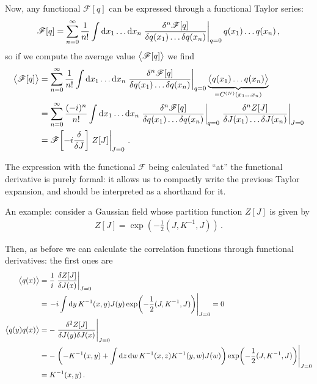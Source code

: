 \documentclass[main.tex]{subfiles}
\begin{document}
Now, any functional \(\mathscr{F} [q]\) can be expressed through a functional Taylor series:
%
\begin{align}
\mathscr{F}[q] = \sum _{n=0}^{\infty } \frac{1}{n!}
\int \dd{x_1} \dots \dd{x_n} \eval{\frac{ \delta^{n} \mathscr{F}[q]}{ \delta q(x_1) \dots \delta q(x_n)}}_{q = 0} q(x_1) \dots q(x_n)
\,,
\end{align}
%
so if we compute the average value \(\expval{\mathscr{F}[q]}\) we find 
%
\begin{align}
\expval{\mathscr{F}[q]} &= 
\sum _{n=0}^{\infty } \frac{1}{n!}
\int \dd{x_1} \dots \dd{x_n} \eval{\frac{ \delta^{n} \mathscr{F}[q]}{ \delta q(x_1) \dots \delta q(x_n)}}_{q = 0} \underbrace{\expval{q(x_1) \dots q(x_n)}}_{= C^{(N)} (x_1 \dots x_n)}  \\
&=\sum _{n=0}^{\infty } \frac{(-i)^{n}}{n!}
\int \dd{x_1} \dots \dd{x_n} \eval{\frac{ \delta^{n} \mathscr{F}[q]}{ \delta q(x_1) \dots \delta q(x_n)}}_{q = 0} 
\eval{\frac{ \delta^{n} Z[J]}{ \delta J(x_1 )\dots \delta J(x_n)}}_{J =0 } \\
&= \mathscr{F}\qty[ -i \fdv{}{J}]\eval{ Z[J]}_{J=0}
\,.
\end{align}

The expression with the functional \(\mathscr{F}\) being calculated ``at'' the functional derivative is purely formal: it allows us to compactly write the previous Taylor expansion, and should be interpreted as a shorthand for it.  

An example: consider a Gaussian field whose partition function \(Z[J]\) is given by 
%
\begin{align}
Z[J] = \exp( - \frac{1}{2} (J, K^{-1}, J))
\,.
\end{align}

Then, as before we can calculate the correlation functions through functional derivatives: the first ones are 
%
\begin{align}
\expval{q(x)} &= \frac{1}{i} \eval{\fdv{Z[J]}{J(x)}}_{J=0}  \\
&= \eval{-i \int \dd{y} K^{-1}(x, y) J(y) \exp(- \frac{1}{2} (J, K^{-1}, J))}_{J =0} =0\\
\expval{q(y)q(x)} &= -\eval{\frac{ \delta^2 Z[J]}{ \delta  J(y) \delta  J (x)}}_{J=0} \\
&= -\eval{\qty(-K^{-1}(x, y) + \int \dd{z} \dd{w} K^{-1} (x, z)K^{-1} (y, w) J(w))\exp(- \frac{1}{2} (J, K^{-1}, J))}_{J =0}  \\
&= K^{-1} (x, y)
\,.
\end{align}
\end{document}
